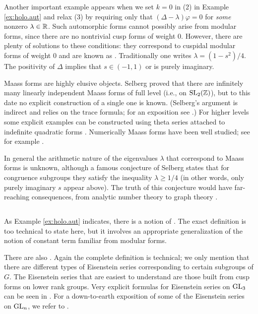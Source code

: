 \begin{example}
Another important example appears when we set $k=0$ in (2) in Example
\ref{ex:holo.aut} and relax (3) by requiring only that $(\Delta
-\lambda)\varphi =0$ for \emph{some} nonzero $\lambda \in \mathbb{R}$.  Such
automorphic forms cannot possibly arise from modular forms, since
there are no nontrivial cusp forms of weight 0.  However, there are
plenty of solutions to these conditions: they correspond to
 cuspidal modular forms of weight 0 and
are known as .  Traditionally one writes $\lambda =
(1-s^{2})/4$.  The positivity of $\Delta$ implies that $s\in
(-1,1)$ or is purely imaginary.

Maass forms are highly elusive objects.  Selberg proved that there are
infinitely many linearly independent Maass forms of full level
(i.e., on $\operatorname{SL}_{2} (\mathbb{Z})$), but to this date no explicit construction of
a single one is known.  (Selberg's argument is indirect and relies on
the trace formula; for an exposition see \cite{sarnak}.)  For higher
levels some explicit examples can be constructed using theta series
attached to indefinite quadratic forms \cite{vigneras}.  Numerically
Maass forms have been well studied; see for example \cite{farmer}.

In general the arithmetic nature of the eigenvalues
$\lambda$ that correspond to Maass forms is unknown, although a famous
conjecture of Selberg states that for congruence subgroups they
satisfy the inequality $\lambda \geq 1/4$ (in other words, only purely
imaginary $s$ appear above).  The truth of this
conjecture would have far-reaching consequences, from analytic number
theory to graph theory \cite{lubotzky}.
\end{example}

\subsection{}\label{ss:cusp.eis}
As Example \ref{ex:holo.aut} indicates, there is a notion of .  The exact definition is too technical to state
here, but it involves an appropriate generalization of the notion of
constant term familiar from modular forms.

There are also  \cite{langlands.e.s,
arthur.e.s}.  Again the complete definition is technical; we only
mention that there are different types of Eisenstein series
corresponding to certain subgroups of $G$.  The Eisenstein series that
are easiest to understand are those built from cusp forms on lower
rank groups.  Very explicit formulas for Eisenstein series on
$\operatorname{GL}_{3}$ can be seen in \cite{bump.gl3}.  For a down-to-earth
exposition of some of the Eisenstein series on $\operatorname{GL}_{n}$, we refer to
\cite{goldfeld}.

